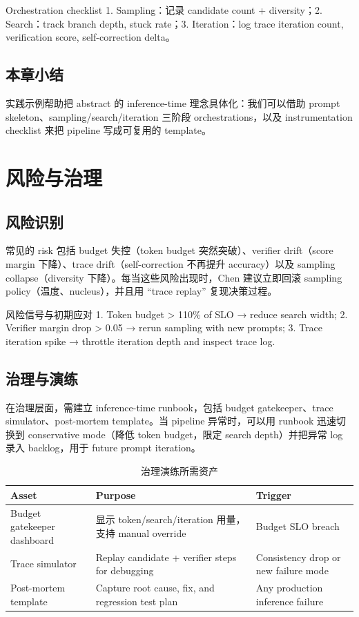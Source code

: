 \documentclass[a4paper]{article}
\begin{document}
\begin{knowledgebox}{Orchestration checklist}
1. Sampling：记录 candidate count + diversity；2. Search：track branch depth, stuck rate；3. Iteration：log trace iteration count, verification score, self-correction delta。
\end{knowledgebox}

\subsection{本章小结}
实践示例帮助把 abstract 的 inference-time 理念具体化：我们可以借助 prompt skeleton、sampling/search/iteration 三阶段 orchestrations，以及 instrumentation checklist 来把 pipeline 写成可复用的 template。

\section{风险与治理}

\subsection{风险识别}
常见的 risk 包括 budget 失控（token budget 突然突破）、verifier drift（score margin 下降）、trace drift（self-correction 不再提升 accuracy）以及 sampling collapse（diversity 下降）。每当这些风险出现时，Chen 建议立即回滚 sampling policy（温度、nucleus），并且用 “trace replay” 复现决策过程。

\begin{warningbox}{风险信号与初期应对}
1. Token budget > 110\% of SLO → reduce search width; 2. Verifier margin drop > 0.05 → rerun sampling with new prompts; 3. Trace iteration spike → throttle iteration depth and inspect trace log.
\end{warningbox}

\subsection{治理与演练}
在治理层面，需建立 inference-time runbook，包括 budget gatekeeper、trace simulator、post-mortem template。当 pipeline 异常时，可以用 runbook 迅速切换到 conservative mode（降低 token budget，限定 search depth）并把异常 log 录入 backlog，用于 future prompt iteration。

\begin{table}[H]
\centering
\caption{治理演练所需资产}
\begin{tabular}{p{}p{}p{}}
\toprule
Asset & Purpose & Trigger \\
\midrule
Budget gatekeeper dashboard & 显示 token/search/iteration 用量，支持 manual override & Budget SLO breach \\
Trace simulator & Replay candidate + verifier steps for debugging & Consistency drop or new failure mode \\
Post-mortem template & Capture root cause, fix, and regression test plan & Any production inference failure \\
\bottomrule
\end{tabular}
\end{table}
\end{document}
